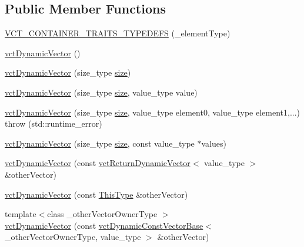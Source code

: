 \subsection*{Public Member Functions}
\begin{DoxyCompactItemize}
\item 
\hyperlink{classvct_dynamic_vector_aa0b0fe497bd9e6b7e96d1c085922618c}{V\-C\-T\-\_\-\-C\-O\-N\-T\-A\-I\-N\-E\-R\-\_\-\-T\-R\-A\-I\-T\-S\-\_\-\-T\-Y\-P\-E\-D\-E\-F\-S} (\-\_\-element\-Type)
\item 
\hyperlink{classvct_dynamic_vector_ab0d22db1d7488bea07b8524c544e3419}{vct\-Dynamic\-Vector} ()
\item 
\hyperlink{classvct_dynamic_vector_adad179fb15ce3fd0a95eae0687d7deb4}{vct\-Dynamic\-Vector} (size\-\_\-type \hyperlink{classvct_dynamic_const_vector_base_a79950d8cced7fd4e790d9ac2ca1c43a7}{size})
\item 
\hyperlink{classvct_dynamic_vector_abb80c17e617bd04190f6b399bd21c8f7}{vct\-Dynamic\-Vector} (size\-\_\-type \hyperlink{classvct_dynamic_const_vector_base_a79950d8cced7fd4e790d9ac2ca1c43a7}{size}, value\-\_\-type value)
\item 
\hyperlink{classvct_dynamic_vector_ac30415fdd822ea5e41023f44cabb19c9}{vct\-Dynamic\-Vector} (size\-\_\-type \hyperlink{classvct_dynamic_const_vector_base_a79950d8cced7fd4e790d9ac2ca1c43a7}{size}, value\-\_\-type element0, value\-\_\-type element1,...)  throw (std\-::runtime\-\_\-error)
\item 
\hyperlink{classvct_dynamic_vector_a765ad3982ec6a04c0a05fe7ecb71e3e7}{vct\-Dynamic\-Vector} (size\-\_\-type \hyperlink{classvct_dynamic_const_vector_base_a79950d8cced7fd4e790d9ac2ca1c43a7}{size}, const value\-\_\-type $\ast$values)
\item 
\hyperlink{classvct_dynamic_vector_a1985d60230fad1b87c021077ef4da997}{vct\-Dynamic\-Vector} (const \hyperlink{classvct_return_dynamic_vector}{vct\-Return\-Dynamic\-Vector}$<$ value\-\_\-type $>$ \&other\-Vector)
\item 
\hyperlink{classvct_dynamic_vector_ab0fa5c2ea18e3546b8936c219acce8a6}{vct\-Dynamic\-Vector} (const \hyperlink{classvct_dynamic_const_vector_base_a39da273523717f678f54d3321ebca3dd}{This\-Type} \&other\-Vector)
\item 
{\footnotesize template$<$class \-\_\-other\-Vector\-Owner\-Type $>$ }\\\hyperlink{classvct_dynamic_vector_a713a3a224d3f6cc55190c1ff7abb720e}{vct\-Dynamic\-Vector} (const \hyperlink{classvct_dynamic_const_vector_base}{vct\-Dynamic\-Const\-Vector\-Base}$<$ \-\_\-other\-Vector\-Owner\-Type, value\-\_\-type $>$ \&other\-Vector)

\end{DoxyCompactItemize}
